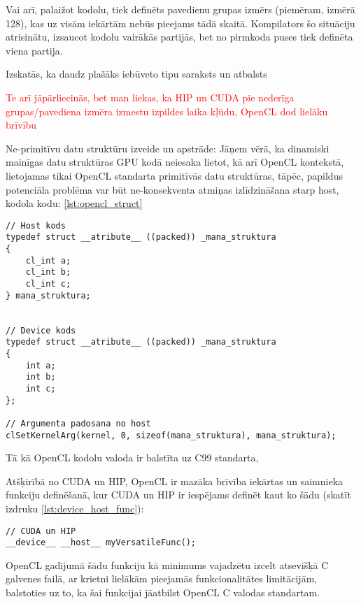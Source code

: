 \documentclass[12pt]{report}%
\theoremstyle{definition}
\begin{document}
Vai arī, palaižot kodolu, tiek definēts pavedienu grupas izmērs (piemēram, izmērā 128), kas uz visām iekārtām nebūs pieejams tādā skaitā.
Kompilators šo situāciju atrisinātu, izsaucot kodolu vairākās partijās, bet no pirmkoda puses tiek definēta viena partija. 

Izskatās, ka daudz plašāks iebūveto tipu saraksts un atbalsts

\textcolor{red}{Te arī jāpārliecinās, bet man liekas, ka HIP un CUDA pie nederīga grupas/pavediena izmēra izmestu izpildes laika kļūdu, OpenCL dod lielāku brīvību}

Ne-primitīvu datu struktūru izveide un apstrāde:
Jāņem vērā, ka dinamiski mainīgas datu struktūras GPU kodā neiesaka lietot, kā arī OpenCL kontekstā, lietojamas tikai OpenCL standarta primitīvās datu struktūras,
tāpēc, papildus potenciāla problēma var būt ne-konsekventa atmiņas izlīdzināšana starp host, kodola kodu: \ref{lst:opencl_struct}

\begin{lstlisting}[caption={Piemērs struktūras definēšanai, kura lietojama OpenCL kodolā},
  label=lst:opencl_struct,
  captionpos=t
]
// Host kods
typedef struct __atribute__ ((packed)) _mana_struktura
{
    cl_int a;
    cl_int b;
    cl_int c;
} mana_struktura;


// Device kods
typedef struct __atribute__ ((packed)) _mana_struktura
{
    int a;
    int b;
    int c;
};

// Argumenta padosana no host
clSetKernelArg(kernel, 0, sizeof(mana_struktura), mana_struktura);
\end{lstlisting}

Tā kā OpenCL kodolu valoda ir balstīta uz C99 standarta, 




Atšķirībā no CUDA un HIP, OpenCL ir mazāka brīvība iekārtas un saimnieka
funkciju definēšanā, kur CUDA un HIP ir iespējams definēt kaut ko šādu (skatīt
izdruku \ref{lst:device_host_func}):
\begin{lstlisting}[caption={Piemērs struktūras definēšanai, kura lietojama OpenCL kodolā},
  label=lst:device_host_func,
  captionpos=t
]
// CUDA un HIP
__device__ __host__ myVersatileFunc();
\end{lstlisting}

OpenCL gadījumā šādu funkciju kā minimums vajadzētu izcelt atsevišķā C galvenes
failā, ar krietni lielākām pieejamās funkcionalitātes limitācijām, balstoties
uz to, ka šai funkcijai jāatbilst OpenCL C valodas standartam.
\end{document}
